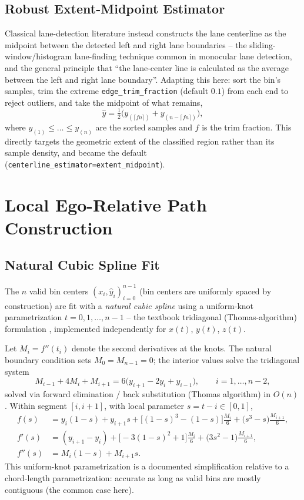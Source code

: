 \documentclass[11pt]{article}
\newcommand{\code}[1]{\texttt{#1}}
\begin{document}
\subsection{Robust Extent-Midpoint Estimator}
Classical lane-detection literature instead constructs the lane centerline as the midpoint between
the detected left and right lane boundaries -- the sliding-window/histogram lane-finding technique
common in monocular lane detection, and the general principle that ``the lane-center line is
calculated as the average between the left and right lane boundary''. Adapting this here: sort the
bin's samples, trim the extreme \code{edge\_trim\_fraction} (default $0.1$) from each end to reject
outliers, and take the midpoint of what remains,
\begin{equation}
\hat{y} = \tfrac{1}{2}\big( y_{(\lceil fn \rceil)} + y_{(n - \lceil fn \rceil)} \big),
\label{eq:extentmid}
\end{equation}
where $y_{(1)} \le \dots \le y_{(n)}$ are the sorted samples and $f$ is the trim fraction. This
directly targets the geometric extent of the classified region rather than its sample density, and
became the default (\code{centerline\_estimator=extent\_midpoint}).

\section{Local Ego-Relative Path Construction}
\label{sec:local}

\subsection{Natural Cubic Spline Fit}
The $n$ valid bin centers $(x_i, \hat{y}_i)_{i=0}^{n-1}$ (bin centers are uniformly spaced by
construction) are fit with a \emph{natural cubic spline} using a uniform-knot parametrization
$t = 0,1,\dots,n-1$ -- the textbook tridiagonal (Thomas-algorithm) formulation
\citep{numericalrecipes}, implemented independently for $x(t)$, $y(t)$, $z(t)$.

Let $M_i = f''(t_i)$ denote the second derivatives at the knots. The natural boundary condition
sets $M_0 = M_{n-1} = 0$; the interior values solve the tridiagonal system
\begin{equation}
M_{i-1} + 4 M_i + M_{i+1} = 6\big(y_{i+1} - 2y_i + y_{i-1}\big), \qquad i = 1,\dots,n-2,
\end{equation}
solved via forward elimination / back substitution (Thomas algorithm) in $O(n)$. Within segment
$[i, i{+}1]$, with local parameter $s = t - i \in [0,1]$,
\begin{align}
f(s) &= y_i(1{-}s) + y_{i+1}s + \big[(1{-}s)^3 - (1{-}s)\big]\tfrac{M_i}{6} + \big(s^3-s\big)\tfrac{M_{i+1}}{6}, \\
f'(s) &= (y_{i+1}-y_i) + \big[{-}3(1{-}s)^2+1\big]\tfrac{M_i}{6} + \big(3s^2-1\big)\tfrac{M_{i+1}}{6}, \\
f''(s) &= M_i(1{-}s) + M_{i+1}s.
\end{align}
This uniform-knot parametrization is a documented simplification relative to a chord-length
parametrization: accurate as long as valid bins are mostly contiguous (the common case here).
\end{document}
